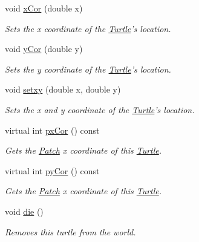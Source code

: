 \begin{DoxyCompactItemize}
\item 
void \hyperlink{classrepast_1_1relogo_1_1_turtle_ad2fbb3478a37d234450362d8384fb457}{x\-Cor} (double x)
\begin{DoxyCompactList}\small\item\em Sets the x coordinate of the \hyperlink{classrepast_1_1relogo_1_1_turtle}{Turtle}'s location. \end{DoxyCompactList}\item 
void \hyperlink{classrepast_1_1relogo_1_1_turtle_a37b35041e28355a00a994fad94db0f0a}{y\-Cor} (double y)
\begin{DoxyCompactList}\small\item\em Sets the y coordinate of the \hyperlink{classrepast_1_1relogo_1_1_turtle}{Turtle}'s location. \end{DoxyCompactList}\item 
void \hyperlink{classrepast_1_1relogo_1_1_turtle_ab11fc0e94cfd9f414bd7c84022c9e4cd}{setxy} (double x, double y)
\begin{DoxyCompactList}\small\item\em Sets the x and y coordinate of the \hyperlink{classrepast_1_1relogo_1_1_turtle}{Turtle}'s location. \end{DoxyCompactList}\item 
virtual int \hyperlink{classrepast_1_1relogo_1_1_turtle_abeb7b773c8c9d403317587a7acdc1c1f}{px\-Cor} () const 
\begin{DoxyCompactList}\small\item\em Gets the \hyperlink{classrepast_1_1relogo_1_1_patch}{Patch} x coordinate of this \hyperlink{classrepast_1_1relogo_1_1_turtle}{Turtle}. \end{DoxyCompactList}\item 
virtual int \hyperlink{classrepast_1_1relogo_1_1_turtle_a378a3a80d2d33e389d8d78f0e0cae6d2}{py\-Cor} () const 
\begin{DoxyCompactList}\small\item\em Gets the \hyperlink{classrepast_1_1relogo_1_1_patch}{Patch} x coordinate of this \hyperlink{classrepast_1_1relogo_1_1_turtle}{Turtle}. \end{DoxyCompactList}\item 
void \hyperlink{classrepast_1_1relogo_1_1_turtle_aab4d6acd4379da5bcb778930403edcce}{die} ()
\begin{DoxyCompactList}\small\item\em Removes this turtle from the world. \end{DoxyCompactList}\item 

\end{DoxyCompactItemize}
